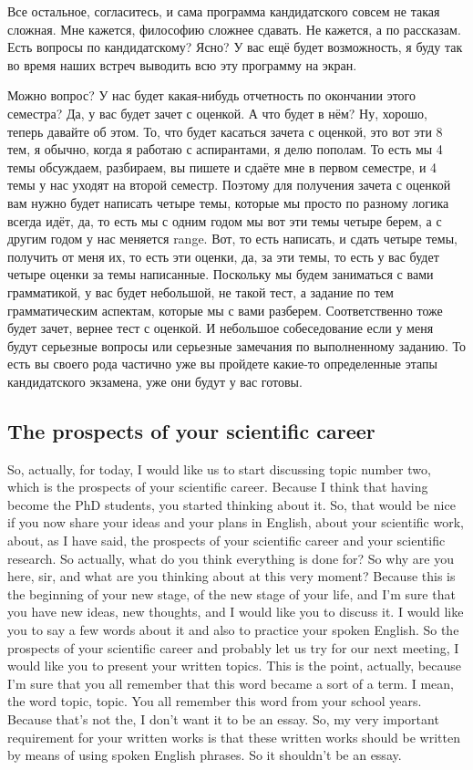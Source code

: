 \documentclass[main.tex]{subfiles}
\begin{document}
Все остальное, согласитесь, и сама программа кандидатского совсем не такая сложная.
Мне кажется, философию сложнее сдавать.
Не кажется, а по рассказам.
Есть вопросы по кандидатскому?
Ясно?
У вас ещё будет возможность, я буду так во время наших встреч выводить всю эту программу на экран.

Можно вопрос? У нас будет какая-нибудь отчетность по окончании этого семестра?
Да, у вас будет зачет с оценкой.
А что будет в нём?
Ну, хорошо, теперь давайте об этом.
То, что будет касаться зачета с оценкой, это вот эти 8 тем, я обычно, когда я работаю с аспирантами, я делю пополам.
То есть мы 4 темы обсуждаем, разбираем, вы пишете и сдаёте мне в первом семестре, и 4 темы у нас уходят на второй семестр.
Поэтому для получения зачета с оценкой вам нужно будет написать четыре темы, которые мы просто по разному логика всегда идёт, да, то есть мы с одним годом мы вот эти темы четыре берем, а с другим годом у нас меняется range.
Вот, то есть написать, и сдать четыре темы, получить от меня их, то есть эти оценки, да, за эти темы, то есть у вас будет четыре оценки за темы написанные.
Поскольку мы будем заниматься с вами грамматикой, у вас будет небольшой, не такой тест, а задание по тем грамматическим аспектам, которые мы с вами разберем.
Соответственно тоже будет зачет, вернее тест с оценкой.
И небольшое собеседование если у меня будут серьезные вопросы или серьезные замечания по выполненному заданию.
То есть вы своего рода частично уже вы пройдете какие-то определенные этапы кандидатского экзамена, уже они будут у вас готовы.

\subsection{The prospects of your scientific career}

So, actually, for today, I would like us to start discussing topic number two, which is the prospects of your scientific career.
Because I think that having become the PhD students, you started thinking about it.
So, that would be nice if you now share your ideas and your plans in English, about your scientific work, about, as I have said, the prospects of your scientific career and your scientific research.
So actually, what do you think everything is done for?
So why are you here, sir, and what are you thinking about at this very moment?
Because this is the beginning of your new stage, of the new stage of your life, and I'm sure that you have new ideas, new thoughts, and I would like you to discuss it.
I would like you to say a few words about it and also to practice your spoken English.
So the prospects of your scientific career and probably let us try for our next meeting, I would like you to present your written topics.
This is the point, actually, because I'm sure that you all remember that this word became a sort of a term.
I mean, the word topic, topic.
You all remember this word from your school years.
Because that's not the, I don't want it to be an essay.
So, my very important requirement for your written works is that these written works should be written by means of using spoken English phrases.
So it shouldn't be an essay.
\end{document}
